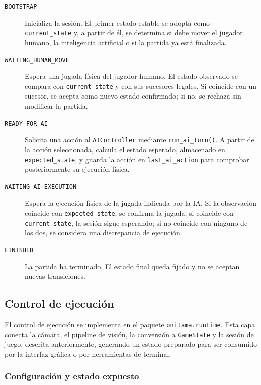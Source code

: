 \begin{description}
    \item[\texttt{BOOTSTRAP}] Inicializa la sesión. El primer estado estable se adopta como \texttt{current\_state} y, a partir de él, se determina si debe mover el jugador humano, la inteligencia artificial o si la partida ya está finalizada.

    \item[\texttt{WAITING\_HUMAN\_MOVE}] Espera una jugada física del jugador humano. El estado observado se compara con \texttt{current\_state} y con sus sucesores legales. Si coincide con un sucesor, se acepta como nuevo estado confirmado; si no, se rechaza sin modificar la partida.

    \item[\texttt{READY\_FOR\_AI}] Solicita una acción al \texttt{AIController} mediante \texttt{run\_ai\_turn()}. A partir de la acción seleccionada, calcula el estado esperado, almacenado en \texttt{expected\_state}, y guarda la acción en \texttt{last\_ai\_action} para comprobar posteriormente su ejecución física.

    \item[\texttt{WAITING\_AI\_EXECUTION}] Espera la ejecución física de la jugada indicada por la IA. Si la observación coincide con \texttt{expected\_state}, se confirma la jugada; si coincide con \texttt{current\_state}, la sesión sigue esperando; si no coincide con ninguno de los dos, se considera una discrepancia de ejecución.

    \item[\texttt{FINISHED}] La partida ha terminado. El estado final queda fijado y no se aceptan nuevas transiciones.
\end{description}


\subsection{Control de ejecución}
\label{subsec:control-ejecucion}

El control de ejecución se implementa en el paquete \texttt{onitama.runtime}. Esta capa conecta la cámara, el pipeline de visión, la conversión a \texttt{GameState} y la sesión de juego, descrita anteriormente, generando un estado preparado para ser consumido por la interfaz gráfica o por herramientas de terminal.

\subsubsection{Configuración y estado expuesto}

